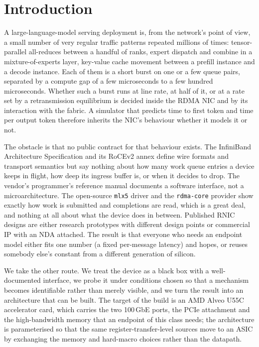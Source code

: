 \section{Introduction}
\label{sec:intro}

A large-language-model serving deployment is, from the network's point of view,
a small number of very regular traffic patterns repeated millions of times:
tensor-parallel all-reduces between a handful of ranks, expert dispatch and
combine in a mixture-of-experts layer, key-value cache movement between a
prefill instance and a decode instance. Each of them is a short burst on one or
a few queue pairs, separated by a compute gap of a few microseconds to a few
hundred microseconds. Whether such a burst runs at line rate, at half of it, or
at a rate set by a retransmission equilibrium is decided inside the RDMA NIC and
by its interaction with the fabric. A simulator that predicts time to first
token and time per output token therefore inherits the NIC's behaviour whether
it models it or not.

The obstacle is that no public contract for that behaviour exists. The
InfiniBand Architecture Specification and its RoCEv2 annex define wire formats
and transport semantics but say nothing about how many work queue entries a
device keeps in flight, how deep its ingress buffer is, or when it decides to
drop. The vendor's programmer's reference manual documents a software
interface, not a microarchitecture. The open-source \texttt{mlx5} driver and
the \texttt{rdma-core} provider show exactly how work is submitted and
completions are read, which is a great deal, and nothing at all about what the
device does in between. Published RNIC designs are either research prototypes
with different design points or commercial IP with an NDA attached. The result
is that everyone who needs an endpoint model either fits one number (a fixed
per-message latency) and hopes, or reuses somebody else's constant from a
different generation of silicon.

We take the other route. We treat the device as a black box with a
well-documented interface, we probe it under conditions chosen so that a
mechanism becomes identifiable rather than merely visible, and we turn the
result into an architecture that can be built. The target of the build is an
AMD Alveo U55C accelerator card, which carries the two 100\,GbE ports, the PCIe
attachment and the high-bandwidth memory that an endpoint of this class needs;
the architecture is parameterised so that the same register-transfer-level
sources move to an ASIC by exchanging the memory and hard-macro choices rather
than the datapath.

